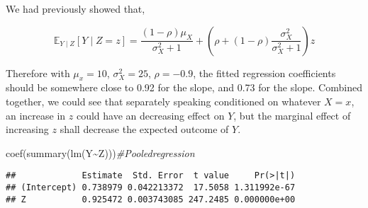 \documentclass[
]{book}
\newenvironment{Shaded}{\begin{snugshade}}{\end{snugshade}}
\newcommand{\CommentTok}[1]{\textcolor[rgb]{0.56,0.35,0.01}{\textit{#1}}}
\newcommand{\FunctionTok}[1]{\textcolor[rgb]{0.00,0.00,0.00}{#1}}
\newcommand{\NormalTok}[1]{#1}
\newcommand{\SpecialCharTok}[1]{\textcolor[rgb]{0.00,0.00,0.00}{#1}}
\begin{document}
We had previously showed that,

\[ 
\mathbb{E}_{Y \mid Z}[Y \mid Z=z] =\frac{(1-\rho) \mu_X}{\sigma_X^2+1}+\left(\rho+(1-\rho) \frac{\sigma_X^2}{\sigma_X^2+1}\right) z
\]

Therefore with \(\mu_x=10\), \(\sigma_X^{2}=25\), \(\rho=-0.9\), the fitted regression coefficients should be somewhere close to 0.92 for the slope, and 0.73 for the slope. Combined together, we could see that separately speaking conditioned on whatever \(X=x\), an increase in \(z\) could have an decreasing effect on \(Y\), but the marginal effect of increasing \(z\) shall decrease the expected outcome of \(Y\).

\begin{Shaded}
\begin{Highlighting}[]
\FunctionTok{coef}\NormalTok{(}\FunctionTok{summary}\NormalTok{(}\FunctionTok{lm}\NormalTok{(Y}\SpecialCharTok{\textasciitilde{}}\NormalTok{Z)))}\CommentTok{\#Pooledregression}
\end{Highlighting}
\end{Shaded}

\begin{verbatim}
##             Estimate  Std. Error  t value     Pr(>|t|)
## (Intercept) 0.738979 0.042213372  17.5058 1.311992e-67
## Z           0.925472 0.003743085 247.2485 0.000000e+00
\end{verbatim}
\end{document}
